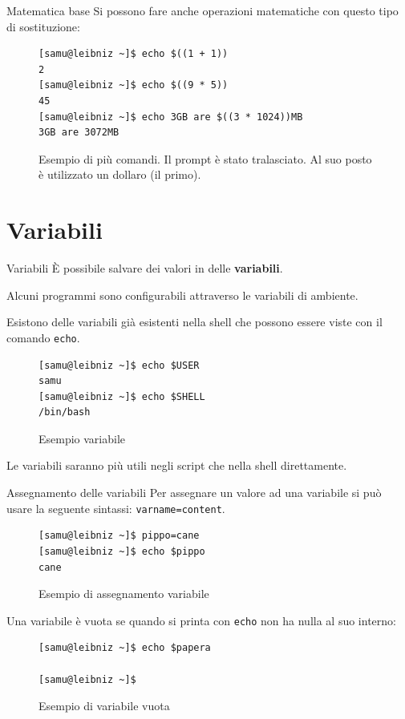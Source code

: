 \documentclass{beamer}
\begin{document}
\begin{frame}[fragile]{Matematica base}
  Si possono fare anche operazioni matematiche con questo tipo di sostituzione:
  \begin{figure}
    \begin{lstlisting}
[samu@leibniz ~]$ echo $((1 + 1))
2
[samu@leibniz ~]$ echo $((9 * 5))
45
[samu@leibniz ~]$ echo 3GB are $((3 * 1024))MB
3GB are 3072MB
    \end{lstlisting}
    \caption{Esempio di più comandi. Il prompt è stato tralasciato. Al suo posto
    è utilizzato un dollaro (il primo).}
  \end{figure}
\end{frame}

\section{Variabili}
\begin{frame}[fragile]{Variabili}
  È possibile salvare dei valori in delle \textbf{variabili}. \medskip

  Alcuni programmi sono configurabili attraverso le variabili di ambiente. 
  \medskip

  Esistono delle variabili già esistenti nella shell che possono essere viste
  con il comando \texttt{echo}. \medskip

  \begin{figure}
    \begin{lstlisting}
[samu@leibniz ~]$ echo $USER
samu
[samu@leibniz ~]$ echo $SHELL
/bin/bash
    \end{lstlisting}
    \caption{Esempio variabile}
  \end{figure}

  Le variabili saranno più utili negli script che nella shell direttamente. 
  \medskip
\end{frame}

\begin{frame}[fragile]{Assegnamento delle variabili}
  Per assegnare un valore ad una variabile si può usare la seguente sintassi:
  \texttt{varname=content}.

  \begin{figure}
    \begin{lstlisting}
[samu@leibniz ~]$ pippo=cane
[samu@leibniz ~]$ echo $pippo
cane
    \end{lstlisting}
    \caption{Esempio di assegnamento variabile}
  \end{figure}

  Una variabile è vuota se quando si printa con \texttt{echo} non ha nulla al suo
  interno:
  \begin{figure}
    \begin{lstlisting}
[samu@leibniz ~]$ echo $papera

[samu@leibniz ~]$ 
    \end{lstlisting}
    \caption{Esempio di variabile vuota}
  \end{figure}
\end{frame}
\end{document}
